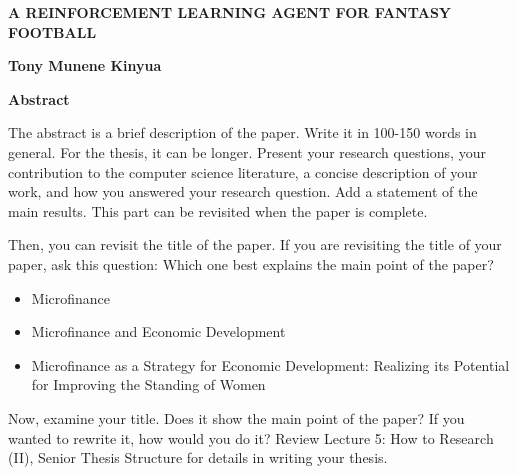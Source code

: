 \thispagestyle{plain}
\begin{center}
    \Large
    \textbf{A REINFORCEMENT LEARNING AGENT FOR FANTASY FOOTBALL}
    
    \vspace{0.4cm}
    \large
    
    \vspace{0.4cm}
    \textbf{Tony Munene Kinyua}
    
    \vspace{0.9cm}
    \textbf{Abstract}
\end{center}


The abstract is a brief description of the paper. Write it in 100-150 words in general. For the thesis, it can be longer. Present your research questions, your contribution to the computer science literature, a concise description of your work, and how you answered your research question. Add a statement of the main results. 
This part can be revisited when the paper is complete. 

\hfill

Then, you can revisit the title of the paper. If you are revisiting the title of your paper, ask this question: Which one best explains the main point of the paper? 

\begin{itemize}
    \item Microfinance
    \item Microfinance and Economic Development
    \item Microfinance as a Strategy for Economic Development: Realizing its Potential for Improving the Standing of Women
\end{itemize}

Now, examine your title. Does it show the main point of the paper? If you wanted to rewrite it, how would you do it? 
Review Lecture 5: How to Research (II), Senior Thesis Structure for details in writing your thesis.  



